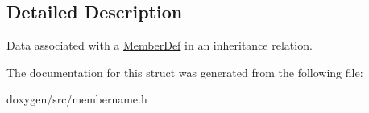 \subsection{Detailed Description}
Data associated with a \mbox{\hyperlink{class_member_def}{Member\+Def}} in an inheritance relation. 

The documentation for this struct was generated from the following file\+:\begin{DoxyCompactItemize}
\item 
doxygen/src/membername.\+h\end{DoxyCompactItemize}
